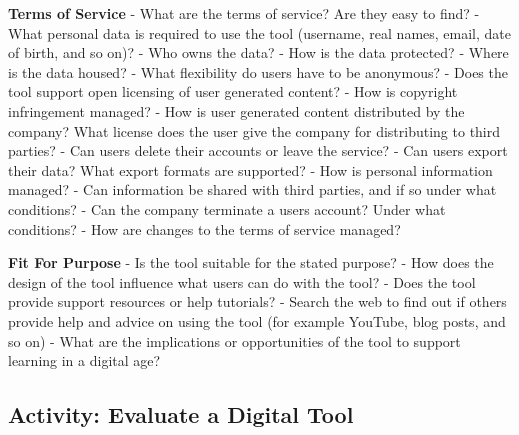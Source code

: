 \documentclass[
  letterpaper,
  DIV=11,
  numbers=noendperiod]{scrreprt}
\begin{document}
\begin{tcolorbox}
\textbf{Terms of Service} - What are the terms of service? Are they easy
to find? - What personal data is required to use the tool (username,
real names, email, date of birth, and so on)? - Who owns the data? - How
is the data protected? - Where is the data housed? - What flexibility do
users have to be anonymous? - Does the tool support open licensing of
user generated content? - How is copyright infringement managed? - How
is user generated content distributed by the company? What license does
the user give the company for distributing to third parties? - Can users
delete their accounts or leave the service? - Can users export their
data? What export formats are supported? - How is personal information
managed? - Can information be shared with third parties, and if so under
what conditions? - Can the company terminate a users account? Under what
conditions? - How are changes to the terms of service managed?

\textbf{Fit For Purpose} - Is the tool suitable for the stated purpose?
- How does the design of the tool influence what users can do with the
tool? - Does the tool provide support resources or help tutorials? -
Search the web to find out if others provide help and advice on using
the tool (for example YouTube, blog posts, and so on) - What are the
implications or opportunities of the tool to support learning in a
digital age?

\end{tcolorbox}

\subsection{Activity: Evaluate a Digital
Tool}\label{activity-evaluate-a-digital-tool}
\end{document}
